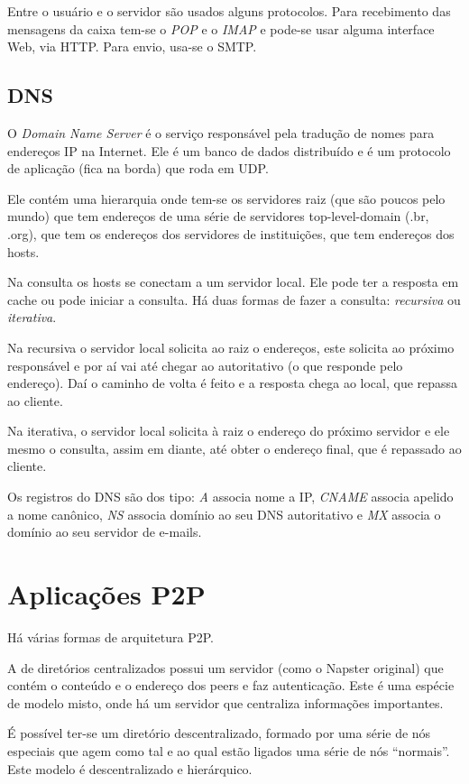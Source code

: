 Entre o usuário e o servidor são usados alguns protocolos. 
Para recebimento das mensagens da caixa tem-se o \emph{POP} e o \emph{IMAP} e pode-se usar alguma interface Web, via HTTP.
Para envio, usa-se o SMTP.

\subsection{DNS}

O \emph{Domain Name Server} é o serviço responsável pela tradução de nomes para endereços IP na Internet.
Ele é um banco de dados distribuído e é um protocolo de aplicação (fica na borda) que roda em UDP.

Ele contém uma hierarquia onde tem-se os servidores raiz (que são poucos pelo mundo) 
que tem endereços de uma série de servidores top-level-domain (.br, .org), 
que tem os endereços dos servidores de instituições, que tem endereços dos hosts.

Na consulta os hosts se conectam a um servidor local. Ele pode ter a resposta em cache ou pode iniciar a consulta.
Há duas formas de fazer a consulta: \emph{recursiva} ou \emph{iterativa}.

Na recursiva o servidor local solicita ao raiz o endereços, este solicita ao próximo responsável e por aí vai até chegar ao autoritativo (o que responde pelo endereço).
Daí o caminho de volta é feito e a resposta chega ao local, que repassa ao cliente.

Na iterativa, o servidor local solicita à raiz o endereço do próximo servidor e ele mesmo o consulta, assim em diante, até obter o endereço final, que é repassado ao cliente.

Os registros do DNS são dos tipo: 
\emph{A} associa nome a IP, 
\emph{CNAME} associa apelido a nome canônico, 
\emph{NS} associa domínio ao seu DNS autoritativo 
e \emph{MX} associa o domínio ao seu servidor de e-mails.

\section{Aplicações P2P}

Há várias formas de arquitetura P2P.

A de diretórios centralizados possui um servidor (como o Napster original) que contém o conteúdo e o endereço dos peers e faz autenticação.
Este é uma espécie de modelo misto, onde há um servidor que centraliza informações importantes.

É possível ter-se um diretório descentralizado, formado por uma série de nós especiais que agem como tal e ao qual estão ligados uma série de nós ``normais''. 
Este modelo é descentralizado e hierárquico.


